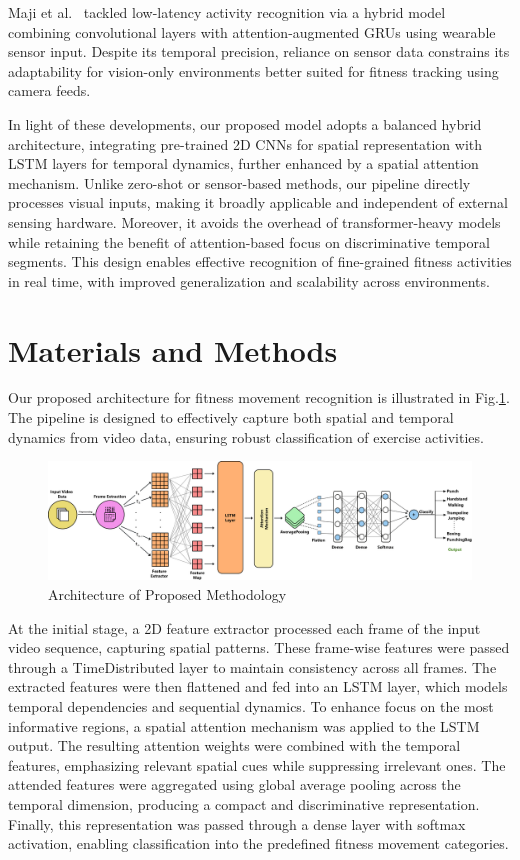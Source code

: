 \documentclass[conference]{IEEEtran}
\begin{document}
Maji et al.~\cite{maji2023} tackled low-latency activity recognition via a hybrid model combining convolutional layers with attention-augmented GRUs using wearable sensor input. Despite its temporal precision, reliance on sensor data constrains its adaptability for vision-only environments better suited for fitness tracking using camera feeds.

In light of these developments, our proposed model adopts a balanced hybrid architecture, integrating pre-trained 2D CNNs for spatial representation with LSTM layers for temporal dynamics, further enhanced by a spatial attention mechanism. Unlike zero-shot or sensor-based methods, our pipeline directly processes visual inputs, making it broadly applicable and independent of external sensing hardware. Moreover, it avoids the overhead of transformer-heavy models while retaining the benefit of attention-based focus on discriminative temporal segments. This design enables effective recognition of fine-grained fitness activities in real time, with improved generalization and scalability across environments.

\section{Materials and Methods} 
Our proposed architecture for fitness movement recognition is illustrated in Fig.\ref{fig1}. The pipeline is designed to effectively capture both spatial and temporal dynamics from video data, ensuring robust classification of exercise activities.
\begin{figure}[htbp]
\centering
\includegraphics[width=\textwidth]{Model_overview.png}
\caption{Architecture of Proposed Methodology}
\label{fig1}
\end{figure}

At the initial stage, a 2D feature extractor processed each frame of the input video sequence, capturing spatial patterns. These frame-wise features were passed through a TimeDistributed layer to maintain consistency across all frames. The extracted features were then flattened and fed into an LSTM layer, which models temporal dependencies and sequential dynamics. To enhance focus on the most informative regions, a spatial attention mechanism was applied to the LSTM output. The resulting attention weights were combined with the temporal features, emphasizing relevant spatial cues while suppressing irrelevant ones. The attended features were aggregated using global average pooling across the temporal dimension, producing a compact and discriminative representation. Finally, this representation was passed through a dense layer with softmax activation, enabling classification into the predefined fitness movement categories.
\end{document}
